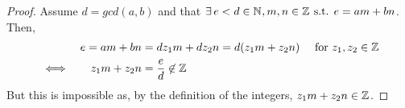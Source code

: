 \documentclass[MathsNotesBase.tex]{subfiles}
\begin{document}
{			
			\begin{proof}
				Assume $d = gcd(a,b)$ and that $\exists\, e < d \in \mathbb{N}^{}, m,n \in \mathbb{Z}^{} \text{ s.t. } e = am + bn$. Then,
				\begin{align*}
					&&e = am + bn &= dz_1m + dz_2n = d(z_1m + z_2n) \hspace{10pt} \text{ for } z_1, z_2 \in \mathbb{Z}^{} \\
					&\iff &z_1m + z_2n &= \frac{e}{d} \not\in \mathbb{Z}^{}
				\end{align*}
				But this is impossible as, by the definition of the integers, $z_1m + z_2n \in \mathbb{Z}^{}$.
			\end{proof}
		}
	
\end{document}

